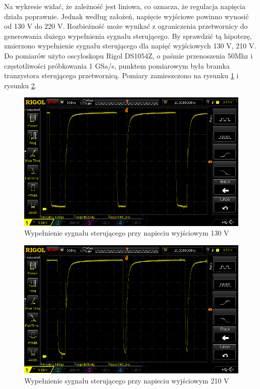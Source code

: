 \documentclass[../main.tex]{subfiles}
\begin{document}
Na wykresie widać, że zależność jest liniowa, co oznacza, że regulacja napięcia działa poprawnie.
Jednak według założeń, napięcie wyjściowe powinno wynosić od 130 V do 220 V.
Rozbieżność może wynikać z ograniczenia przetwornicy do generowania dużego wypełnienia sygnału sterującego.
By sprawdzić tą hipotezę, zmierzono wypełnienie sygnału sterującego dla napięć wyjściowych 130 V, 210 V.
Do pomiarów użyto oscyloskopu Rigol DS1054Z, o paśmie przenoszenia 50Mhz i częstotliwości próbkowania 1 GSa/s,
punktem pomiarowym była bramka tranzystora sterującego przetwornicą. Pomiary zamieszczono na rysunku \ref{fig:duty_130} i rysunku \ref{fig:duty_210}.

\begin{figure}[H]
    \centering
    \includegraphics[width=1\textwidth]{duty_130.png}
    \caption{Wypełnienie sygnału sterującego przy napieciu wyjściowym 130 V}
    \label{fig:duty_130}
\end{figure}

\begin{figure}[H]
    \centering
    \includegraphics[width=1\textwidth]{duty_210.png}
    \caption{Wypełnienie sygnału sterującego przy napieciu wyjściowym 210 V}
    \label{fig:duty_210}
\end{figure}
\end{document}
